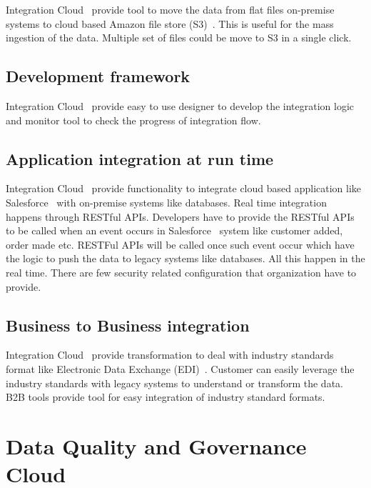 Integration Cloud~\cite{hid-sp18-511-iics} provide tool to move the data from flat files on-premise systems to cloud based Amazon file store (S3)~\cite{hid-sp18-511-aws-s3}. This is useful for the mass ingestion of the data. Multiple set of files could be move to S3 in a single click.

\subsection{Development framework}

Integration Cloud~\cite{hid-sp18-511-iics} provide easy to use designer to develop the integration logic and monitor tool to check the progress of integration flow.

\subsection{Application integration at run time}

Integration Cloud~\cite{hid-sp18-511-iics} provide functionality to integrate cloud based application like Salesforce~\cite{hid-sp18-511-salesforce} with on-premise systems like databases. Real time integration happens through RESTful APIs. Developers have to provide the RESTful APIs to be called when an event occurs in Salesforce~\cite{hid-sp18-511-salesforce} system like customer added, order made etc. RESTFul APIs will be called once such event occur which have the logic to push the data to legacy systems like databases. All this happen in the real time. There are few security related configuration that organization have to provide.

\subsection{Business to Business integration}

Integration Cloud~\cite{hid-sp18-511-iics} provide transformation to deal with industry standards format like Electronic Data Exchange (EDI)~\cite{hid-sp18-511-edi}. Customer can easily leverage the industry standards with legacy systems to understand or transform the data. B2B tools provide tool for easy integration of industry standard formats.

\section{Data Quality and Governance Cloud}

